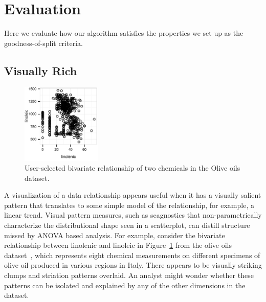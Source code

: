 \section{Evaluation}
\label{sec:evaluation}
Here we evaluate how our algorithm satisfies the properties we set up as the goodness-of-split criteria.

\subsection{Visually Rich}

\begin{figure}
 \centering 
\includegraphics[width=1.5in]{images/linolenic-linoleic.pdf}
  \caption{User-selected bivariate relationship of two chemicals in the Olive oils dataset.}
 \label{fig:vrich_all}
\end{figure}
A visualization of a data relationship appears useful when it has a visually salient pattern that translates to some simple model of the relationship, for example, a linear trend. Visual pattern measures, such as scagnostics that non-parametrically characterize the distributional shape seen in a scatterplot, can distill structure missed by ANOVA based analysis. For example, consider the bivariate relationship between linolenic and linoleic in Figure~\ref{fig:vrich_all} from the olive oils dataset~\cite{Forina1983}, which represents eight chemical measurements on different specimens of olive oil produced in various regions in Italy. There appears to be visually striking clumps and striation patterns overlaid. An analyst might wonder whether these patterns can be isolated and explained by any of the other dimensions in the dataset.
 

